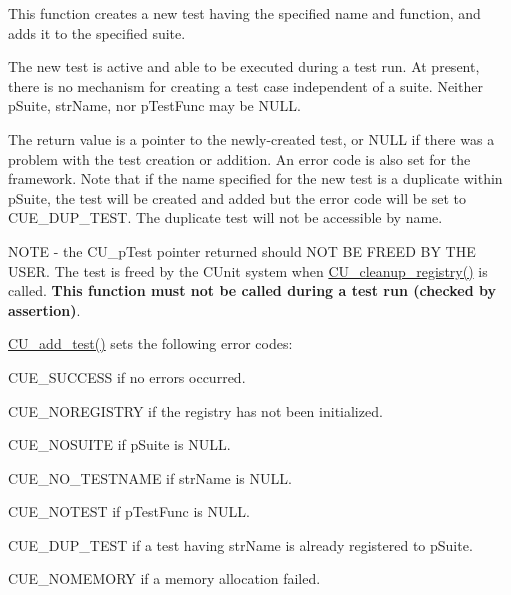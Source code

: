 This function creates a new test having the specified name and function, and adds it to the specified suite. 

The new test is active and able to be executed during a test run. At present, there is no mechanism for creating a test case independent of a suite. Neither p\-Suite, str\-Name, nor p\-Test\-Func may be N\-U\-L\-L.

The return value is a pointer to the newly-\/created test, or N\-U\-L\-L if there was a problem with the test creation or addition. An error code is also set for the framework. Note that if the name specified for the new test is a duplicate within p\-Suite, the test will be created and added but the error code will be set to C\-U\-E\-\_\-\-D\-U\-P\-\_\-\-T\-E\-S\-T. The duplicate test will not be accessible by name.\par
\par


N\-O\-T\-E -\/ the C\-U\-\_\-p\-Test pointer returned should N\-O\-T B\-E F\-R\-E\-E\-D B\-Y T\-H\-E U\-S\-E\-R. The test is freed by the C\-Unit system when \hyperlink{group__Framework_ga183eb7d7f79e149c767237cfef52cb82}{C\-U\-\_\-cleanup\-\_\-registry()} is called. {\bfseries This function must not be called during a test run (checked by assertion)}. \par
\par


\hyperlink{group__Framework_gad9f198a8a5fa8cc6870c3c8be873869f}{C\-U\-\_\-add\-\_\-test()} sets the following error codes\-:
\begin{DoxyItemize}
\item C\-U\-E\-\_\-\-S\-U\-C\-C\-E\-S\-S if no errors occurred.
\item C\-U\-E\-\_\-\-N\-O\-R\-E\-G\-I\-S\-T\-R\-Y if the registry has not been initialized.
\item C\-U\-E\-\_\-\-N\-O\-S\-U\-I\-T\-E if p\-Suite is N\-U\-L\-L.
\item C\-U\-E\-\_\-\-N\-O\-\_\-\-T\-E\-S\-T\-N\-A\-M\-E if str\-Name is N\-U\-L\-L.
\item C\-U\-E\-\_\-\-N\-O\-T\-E\-S\-T if p\-Test\-Func is N\-U\-L\-L.
\item C\-U\-E\-\_\-\-D\-U\-P\-\_\-\-T\-E\-S\-T if a test having str\-Name is already registered to p\-Suite.
\item C\-U\-E\-\_\-\-N\-O\-M\-E\-M\-O\-R\-Y if a memory allocation failed.\par
\par

\end{DoxyItemize}


